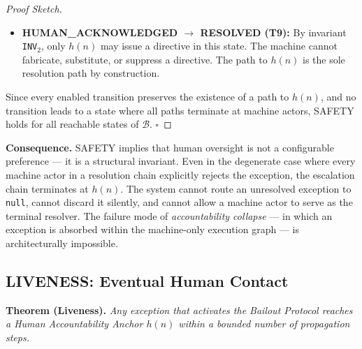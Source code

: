 \begin{proof}[Proof Sketch]
\begin{itemize}
  \item \textbf{HUMAN\_ACKNOWLEDGED $\rightarrow$ RESOLVED (T9):} By invariant \texttt{INV}$_2$, only $h(n)$ may issue a directive in this state. The machine cannot fabricate, substitute, or suppress a directive. The path to $h(n)$ is the sole resolution path by construction.
\end{itemize}

Since every enabled transition preserves the existence of a path to $h(n)$, and no transition leads to a state where all paths terminate at machine actors, SAFETY holds for all reachable states of $\mathcal{B}$. \hfill $\square$
\end{proof}

\medskip\noindent\textbf{Consequence.} SAFETY implies that human oversight is not a configurable preference — it is a structural invariant. Even in the degenerate case where every machine actor in a resolution chain explicitly rejects the exception, the escalation chain terminates at $h(n)$. The system cannot route an unresolved exception to \texttt{null}, cannot discard it silently, and cannot allow a machine actor to serve as the terminal resolver. The failure mode of \emph{accountability collapse} — in which an exception is absorbed within the machine-only execution graph — is architecturally impossible.

\subsection{LIVENESS: Eventual Human Contact}

\textbf{Theorem (Liveness).} \emph{Any exception that activates the Bailout Protocol reaches a Human Accountability Anchor $h(n)$ within a bounded number of propagation steps.}

